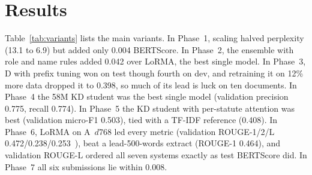 \documentclass[11pt, oneside]{article}
\begin{document}
\section{Results}
\label{sec:results}
Table~\ref{tab:variants} lists the main variants. In Phase~1, scaling halved perplexity (13.1 to 6.9) but added only
0.004 BERTScore. In Phase~2, the ensemble with role and name rules added 0.042 over LoRMA, the best single model. In
Phase~3, D with prefix tuning won on test though fourth on dev, and retraining it on 12\% more data dropped it to
0.398, so much of its lead is luck on ten documents. In Phase~4 the 58M KD student was the best single model
(validation precision 0.775, recall 0.774). In Phase~5 the KD student with per-statute attention was best
(validation micro-F1 0.503), tied with a TF-IDF reference (0.408). In Phase~6, LoRMA on A~$d$768 led every metric
(validation ROUGE-1/2/L 0.472/0.238/0.253~\cite{lin2004rouge}), beat a lead-500-words extract (ROUGE-1 0.464), and
validation ROUGE-L ordered all seven systems exactly as test BERTScore did. In Phase~7 all six submissions lie within
0.008.
\end{document}
